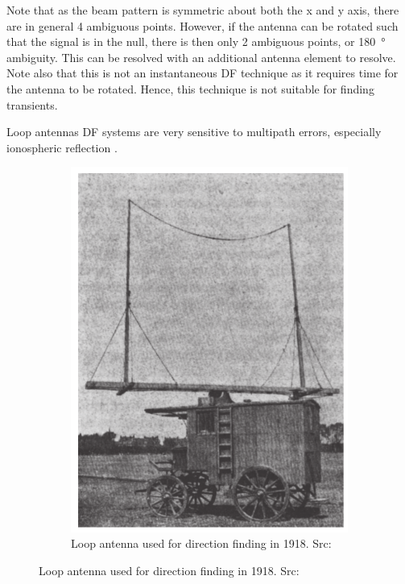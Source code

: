 Note that as the beam pattern is symmetric about both the x and y axis, there are in general 4 ambiguous points. However, if the antenna can be rotated such that the signal is in the null, there is then only 2 ambiguous points, or \SI{180}{\degree} ambiguity. This can be resolved with an  additional antenna element to resolve. Note also that this is not an instantaneous DF technique as it requires time for the antenna to be rotated. Hence, this technique is not suitable for finding transients. 

Loop antennas DF systems are very sensitive to multipath errors, especially ionospheric reflection \cite{jenkins1991smallaperture}. 

\begin{figure}
  \centering
  \begin{subfigure}[b]{0.4\textwidth}
    \includegraphics[width=\textwidth]{./img/lit_review/loop_antenna}
    \caption{Loop antenna used for direction finding in 1918. Src: \cite{grabau1989funkpeiltechnik}}

\end{subfigure}
\end{figure}

